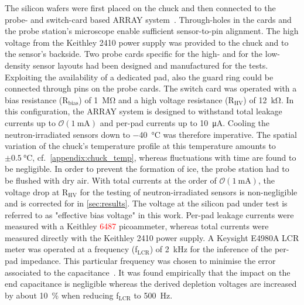 The silicon wafers were first placed on the chuck and then connected to the probe- and switch-card based ARRAY system~\cite{pitters:array2019}.
Through-holes in the cards and the probe station's microscope  enable sufficient sensor-to-pin alignment. 
The high voltage from the Keithley 2410 power supply was provided to the chuck and to the sensor's backside.
Two probe cards specific for the high- and for the low-density sensor layouts had been designed and manufactured for the tests.
Exploiting the availability of a dedicated pad, also the guard ring could be connected through pins on the probe cards.
The switch card was operated with a bias resistance (R$_\text{bias}$) of \SI{1}{\mega\ohm} and a high voltage resistance (R$_\text{HV}$) of \SI{12}{\kilo\ohm}.
In this configuration, the ARRAY system is designed to withstand total leakage currents up to $\mathcal{O}(\SI{1}{\milli\ampere})$ and per-pad currents up to \SI{10}{\micro\ampere}.
Cooling the neutron-irradiated sensors down to \SI{-40}{\celsius} was therefore imperative.
The spatial variation of the chuck's temperature profile at this temperature amounts to $\pm\SI{0.5}{\celsius}$, cf.~\ref{appendix:chuck_temp}, whereas fluctuations with time are found to be negligible. 
In order to prevent the formation of ice, the probe station had to be flushed with dry air. 
With total currents at the order of $\mathcal{O}(\SI{1}{\milli\ampere})$, the voltage drop at R$_\text{HV}$ for the testing of neutron-irradiated sensors is non-negligible and is corrected for in \ref{sec:results}.
The voltage at the silicon pad under test is referred to as "effective bias voltage" in this work.
Per-pad leakage currents were measured with a Keithley \textcolor{red}{6487} picoammeter, whereas total currents were measured directly with the Keithley 2410 power supply.
A Keysight E4980A LCR meter was operated at a frequency (f$_\text{LCR}$) of \SI{2}{\kilo\hertz} for the inference of the per-pad impedance.
This particular frequency was chosen to minimise the error associated to the capacitance~\cite{pitters:array2019}.
It was found empirically that the impact on the end capacitance is negligible whereas the derived depletion voltages are increased by about \SI{10}{\percent} when reducing f$_\text{LCR}$ to \SI{500}{\hertz}. 

